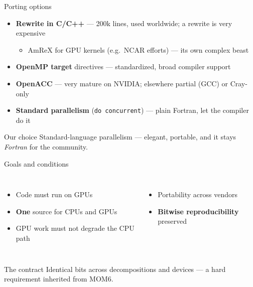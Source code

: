 \documentclass[aspectratio=169]{beamer}
\begin{document}
\begin{frame}{Porting options}
  \begin{itemize}
    \item \textbf{Rewrite in C/C++} --- 200k lines, used worldwide; a rewrite is very expensive
      \begin{itemize}
        \item AmReX for GPU kernels (e.g.\ NCAR efforts) --- its own complex beast
      \end{itemize}
    \item \textbf{OpenMP target} directives --- standardized, broad compiler support
    \item \textbf{OpenACC} --- very mature on NVIDIA; elsewhere partial (GCC) or Cray-only
    \item \textbf{Standard parallelism} (\texttt{do concurrent}) --- plain Fortran, let the compiler do it
  \end{itemize}
  \vspace{.6em}
  \begin{exampleblock}{Our choice}
    Standard-language parallelism --- elegant, portable, and it stays \emph{Fortran} for the community.
  \end{exampleblock}
\end{frame}

\begin{frame}{Goals and conditions}
  \begin{columns}[T,onlytextwidth]
      \begin{itemize}
        \item Code must run on GPUs
        \item \textbf{One} source for CPUs and GPUs
        \item GPU work must not degrade the CPU path
      \end{itemize}
      \begin{itemize}
        \item Portability across vendors
        \item \textbf{Bitwise reproducibility} preserved
      \end{itemize}
  \end{columns}
  \vfill
  \begin{block}{The contract}
    Identical bits across decompositions and devices --- a hard requirement inherited from MOM6.
  \end{block}
\end{frame}
\end{document}
